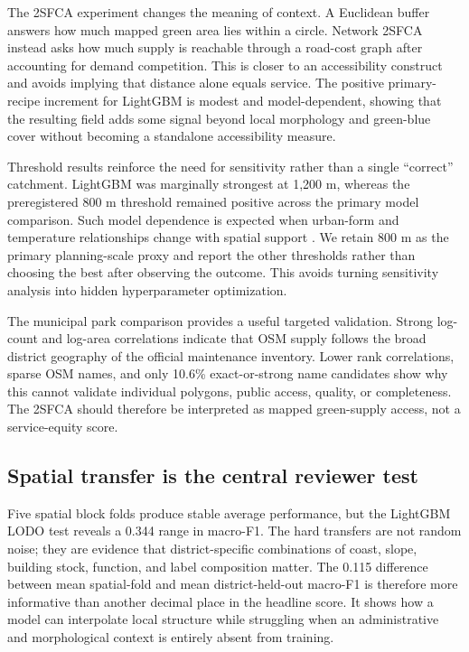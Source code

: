 The 2SFCA experiment changes the meaning of context. A Euclidean buffer answers
how much mapped green area lies within a circle. Network 2SFCA instead asks how
much supply is reachable through a road-cost graph after accounting for demand
competition. This is closer to an accessibility construct and avoids implying
that distance alone equals service. The positive primary-recipe increment for
LightGBM is modest and model-dependent, showing that the resulting field adds
some signal beyond local morphology and green-blue cover without becoming a
standalone accessibility measure.

Threshold results reinforce the need for sensitivity rather than a single
``correct'' catchment. LightGBM was marginally strongest at 1,200 m, whereas
the preregistered 800 m threshold remained positive across the primary model
comparison. Such
model dependence is expected when urban-form and temperature relationships
change with spatial support \citep{wu2022ScaleEffect,jeon2023ImpactsUrban,
li2026InvestigEffect}. We retain 800 m as the primary planning-scale proxy and
report the other thresholds rather than choosing the best after observing the
outcome. This avoids turning sensitivity analysis into hidden hyperparameter
optimization.

The municipal park comparison provides a useful targeted validation. Strong
log-count and log-area correlations indicate that OSM supply follows the broad
district geography of the official maintenance inventory. Lower rank
correlations, sparse OSM names, and only 10.6\% exact-or-strong name candidates
show why this cannot validate individual polygons, public access, quality, or
completeness. The 2SFCA should therefore be interpreted as mapped green-supply
access, not a service-equity score.

\subsection{Spatial transfer is the central reviewer test}

Five spatial block folds produce stable average performance, but the LightGBM
LODO test reveals a 0.344 range in macro-F1. The hard transfers are not random noise; they
are evidence that district-specific combinations of coast, slope, building
stock, function, and label composition matter. The 0.115 difference between
mean spatial-fold and mean district-held-out macro-F1 is therefore more
informative than another decimal place in the headline score. It shows how a
model can interpolate local structure while struggling when an administrative
and morphological context is entirely absent from training.

